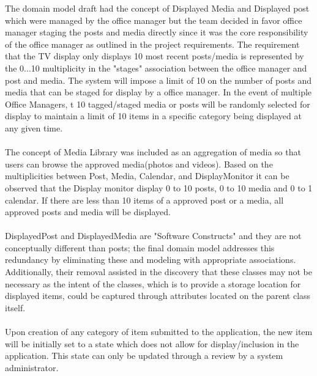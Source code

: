 \documentclass{article}
\begin{document}
    The domain model draft had the concept of Displayed Media and Displayed post which were managed by the office manager but the team decided in favor office manager staging the posts and media directly since it was the core responsibility of the office manager as outlined in the project requirements. The requirement that the TV display only displays 10 most recent posts/media is represented by the 0...10 multiplicity in the "stages" association between the office manager and post and media. The system will impose a limit of 10 on the number of posts and media that can be staged for display by a office manager. In the event of multiple Office Managers, t 10 tagged/staged media or posts will be randomly selected for display to maintain a limit of 10 items in a specific category being displayed at any given time.\\
    \\
    The concept of Media Library was included as an aggregation of media so that users can browse the approved media(photos and videos). Based on the multiplicities between Post, Media, Calendar, and DisplayMonitor it can be observed that the Display monitor display 0 to 10 posts, 0 to 10 media and 0 to 1 calendar. If there are less than 10 items of a approved post or a media, all approved posts and media will be displayed.\\
    \\
    DisplayedPost and DisplayedMedia are "Software Constructs" and they are not conceptually different than posts; the final domain model addresses this redundancy by eliminating these and modeling with appropriate associations. Additionally, their removal assisted in the discovery that these classes may not be necessary as the intent of the classes, which is to provide a storage location for displayed items, could be captured through attributes located on the parent class itself.\\
    \\
    Upon creation of any category of item submitted to the application, the new item will be initially set to a state which does not allow for display/inclusion in the application. This state can only be updated through a review by a system administrator. 
    
\end{document}

